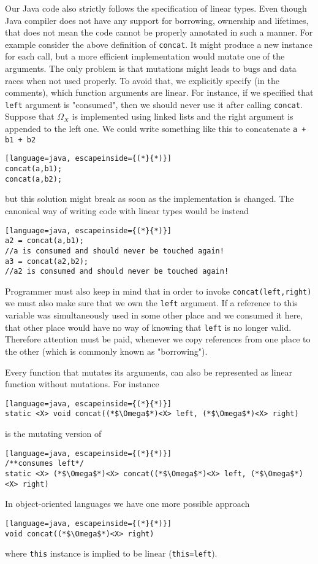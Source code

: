 Our Java code also strictly follows the specification of linear types. Even though Java compiler does not have any support for borrowing, ownership and lifetimes, that does not mean the code cannot be properly annotated in such a manner. For example consider the above definition of \texttt{concat}. It might produce a new instance for each call, but a more efficient implementation would mutate one of the arguments. The only problem is that mutations might leads to bugs and data races when not used properly. To avoid that, we explicitly specify (in the comments), which function arguments are linear.
For instance, if we specified that \texttt{left} argument is "consumed", then we should never use it after calling \texttt{concat}. Suppose that $\Omega_X$ is implemented using linked lists and the right argument is appended to the left one. We could write something like this to concatenate \texttt{a + b1 + b2}
\begin{lstlisting}[language=java, escapeinside={(*}{*)}]
concat(a,b1);
concat(a,b2);
\end{lstlisting}
but this solution might break as soon as the implementation is changed. The canonical way of writing code with linear types would be instead
\begin{lstlisting}[language=java, escapeinside={(*}{*)}]
a2 = concat(a,b1);
//a is consumed and should never be touched again!
a3 = concat(a2,b2);
//a2 is consumed and should never be touched again!
\end{lstlisting}
Programmer must also keep in mind that in order to invoke \texttt{concat(left,right)} we must also make sure that we own the \texttt{left} argument. If a reference to this variable was simultaneously used in some other place and we consumed it here, that other place would have no way of knowing that \texttt{left} is no longer valid. Therefore attention must be paid, whenever we copy references from one place to the other (which is commonly known as "borrowing"). 

Every function that mutates its arguments, can also be represented as linear function without mutations. For instance 
\begin{lstlisting}[language=java, escapeinside={(*}{*)}]
static <X> void concat((*$\Omega$*)<X> left, (*$\Omega$*)<X> right)
\end{lstlisting}
is the mutating version of 
\begin{lstlisting}[language=java, escapeinside={(*}{*)}]
/**consumes left*/
static <X> (*$\Omega$*)<X> concat((*$\Omega$*)<X> left, (*$\Omega$*)<X> right)
\end{lstlisting}
In object-oriented languages we have one more possible approach
\begin{lstlisting}[language=java, escapeinside={(*}{*)}]
void concat((*$\Omega$*)<X> right)
\end{lstlisting}
where \texttt{this} instance is implied to be linear (\texttt{this=left}).

